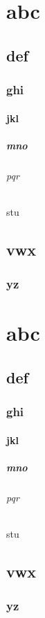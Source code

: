 \documentclass{../../../fithesis3}
\begin{document}
  \tableofcontents

  \part{abc}
  \chapter{def}
  \section{ghi}
  \subsection{jkl}
  \subsubsection{mno}
  \paragraph{pqr}
  \subparagraph{stu}
  \chapter{vwx}
  \section{yz}

  \part{abc}
  \chapter{def}
  \section{ghi}
  \subsection{jkl}
  \subsubsection{mno}
  \paragraph{pqr}
  \subparagraph{stu}
  \chapter{vwx}
  \section{yz}
\end{document}
